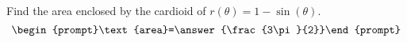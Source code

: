 \documentclass{ximera}
\author{Gregory Hartman \and Matthew Carr}
\begin{document}
\begin{exercise}





Find the area enclosed by the cardioid of $r(\theta)=1-\sin(\theta)$.
\[
\begin{prompt}\text{area}=\answer{\frac{3\pi}{2}}\end{prompt}
\]

\end{exercise}
\end{document}
